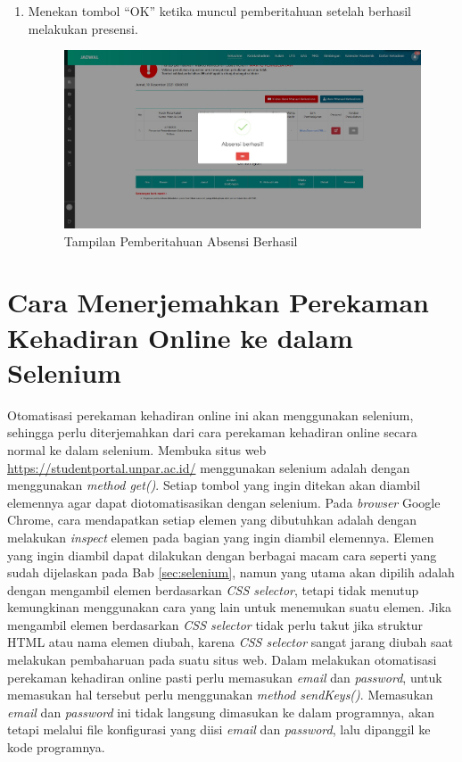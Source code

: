 \begin{enumerate}
	\item Menekan tombol ``OK'' ketika muncul pemberitahuan setelah berhasil melakukan presensi.
	\begin{figure}[H]
		\centering
		\includegraphics[scale=0.225]{Gambar/berhasilAbsen.jpg}
		\caption{Tampilan Pemberitahuan Absensi Berhasil} 
		\label{fig:berhasil}
	\end{figure}
\end{enumerate}

\section{Cara Menerjemahkan Perekaman Kehadiran Online ke dalam Selenium}
\label{sec:terjemah} 
Otomatisasi perekaman kehadiran online ini akan menggunakan selenium, sehingga perlu diterjemahkan dari cara perekaman kehadiran online secara normal ke dalam selenium. Membuka situs web \url{https://studentportal.unpar.ac.id/} menggunakan selenium adalah dengan menggunakan \textit{method get()}. Setiap tombol yang ingin ditekan akan diambil elemennya agar dapat diotomatisasikan dengan selenium. Pada \textit{browser} Google Chrome, cara mendapatkan setiap elemen yang dibutuhkan adalah dengan melakukan \textit{inspect} elemen pada bagian yang ingin diambil elemennya. Elemen yang ingin diambil dapat dilakukan dengan berbagai macam cara seperti yang sudah dijelaskan pada Bab \ref{sec:selenium}, namun yang utama akan dipilih adalah dengan mengambil elemen berdasarkan \textit{CSS selector}, tetapi tidak menutup kemungkinan menggunakan cara yang lain untuk menemukan suatu elemen. Jika mengambil elemen berdasarkan \textit{CSS selector} tidak perlu takut jika struktur HTML atau nama elemen diubah, karena \textit{CSS selector} sangat jarang diubah saat melakukan pembaharuan pada suatu situs web. Dalam melakukan otomatisasi perekaman kehadiran online pasti perlu memasukan \textit{email} dan \textit{password}, untuk memasukan hal tersebut perlu menggunakan \textit{method sendKeys()}. Memasukan \textit{email} dan \textit{password} ini tidak langsung dimasukan ke dalam programnya, akan tetapi melalui file konfigurasi yang diisi \textit{email} dan \textit{password}, lalu dipanggil ke kode programnya. 

